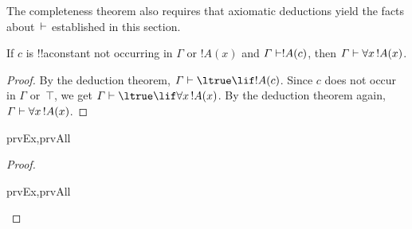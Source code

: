 \documentclass[../../../include/open-logic-section]{subfiles}
\begin{document}


\begin{explain}
  The completeness theorem also requires that axiomatic deductions
  yield the facts about~$\Proves$ established in this section.
\end{explain}

\begin{thm}
 If $c$ is !!a{constant} not occurring
in $\Gamma$ or $!A(x)$ and $\Gamma \Proves !A(c)$, then $\Gamma
\Proves \lforall[x][!A(x)]$.
\end{thm}

\begin{proof}
By the deduction theorem, $\Gamma \Proves \ltrue \lif !A(c)$. Since
$c$ does not occur in $\Gamma$ or~$\top$, we get $\Gamma \Proves
\ltrue \lif \lforall[x][!A(x)]$. By the deduction theorem again, $\Gamma \Proves
\lforall[x][!A(x)]$.
\end{proof}

\begin{prop}
\begin{tagenumerate}{prvEx,prvAll}

\end{tagenumerate}
\end{prop}

\begin{proof}
\begin{tagenumerate}{prvEx,prvAll}
\end{tagenumerate}
\end{proof}
\end{document}
